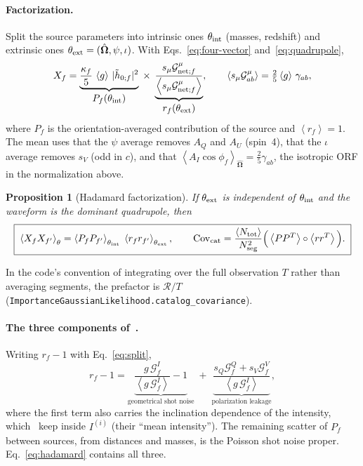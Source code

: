 \documentclass[11pt]{article}
\newcommand{\avg}[1]{\left\langle #1 \right\rangle}
\newcommand{\bOmega}{\hat{\bm{\Omega}}}
\newcommand{\cG}{\mathcal{G}}
\newcommand{\ft}[1]{\tilde{#1}}
\newtheorem{proposition}{Proposition}
\theoremstyle{remark}
\begin{document}
\paragraph{Factorization.}
Split the source parameters into intrinsic ones $\theta_{\rm int}$ (masses,
redshift) and extrinsic ones $\theta_{\rm ext} = (\bOmega, \psi, \iota)$. With
Eqs.~\eqref{eq:four-vector} and~\eqref{eq:quadrupole},
\begin{equation}
  X_f = \underbrace{\frac{\kappa_f}{5}\,\avg{g}\, |\ft h_{0;f}|^2}_{\textstyle P_f(\theta_{\rm int})}
  \;\times\;
  \underbrace{\frac{s_\mu \cG^\mu_{{\rm net};f}}{\avg{s_\mu \cG^\mu_{{\rm net};f}}}}_{\textstyle r_f(\theta_{\rm ext})} ,
  \qquad
  \avg{s_\mu \cG^\mu_{ab}} = \tfrac25\avg{g}\,\gamma_{ab},
  \label{eq:split}
\end{equation}
where $P_f$ is the orientation-averaged contribution of the source and
$\avg{r_f} = 1$. The mean uses that the $\psi$ average removes $A_Q$ and $A_U$
(spin~4), that the $\iota$ average removes $s_V$ (odd in $c$), and that
$\avg{A_I\cos\phi_f}_{\bOmega} = \tfrac25 \gamma_{ab}$, the isotropic ORF in
the normalization above.

\begin{proposition}[Hadamard factorization]
If $\theta_{\rm ext}$ is independent of $\theta_{\rm int}$ and the waveform is
the dominant quadrupole, then
\begin{equation}
  \boxed{\;
  \avg{X_f X_{f'}}_\theta
  = \avg{P_f P_{f'}}_{\theta_{\rm int}} \;
    \avg{r_f r_{f'}}_{\theta_{\rm ext}} ,
  \qquad
  \mathrm{Cov}_{\rm cat} = \frac{\avg{N_{\rm tot}}}{N_{\rm seg}^2}
  \Big( \avg{P P^T} \circ \avg{r r^T} \Big) .
  \;}
  \label{eq:hadamard}
\end{equation}
\end{proposition}

In the code's convention of integrating over the full observation $T$ rather
than averaging segments, the prefactor is $\mathcal R / T$
(\texttt{ImportanceGaussianLikelihood.catalog\_covariance}).

\paragraph{The three components of~\cite{Zhong2026}.}
Writing $r_f - 1$ with Eq.~\eqref{eq:split},
\begin{equation}
  r_f - 1
  = \underbrace{\frac{g\,\cG^I_f}{\avg{g\,\cG^I_f}} - 1}_{\text{geometrical shot noise}}
  \;+\;
  \underbrace{\frac{s_Q\cG^Q_f + s_V\cG^V_f}{\avg{g\,\cG^I_f}}}_{\text{polarization leakage}} ,
\end{equation}
where the first term also carries the inclination dependence of the intensity,
which~\cite{Zhong2026} keep inside $I^{(i)}$ (their ``mean intensity''). The
remaining scatter of $P_f$ between sources, from distances and masses, is the
Poisson shot noise proper. Eq.~\eqref{eq:hadamard} contains all three.
\end{document}

